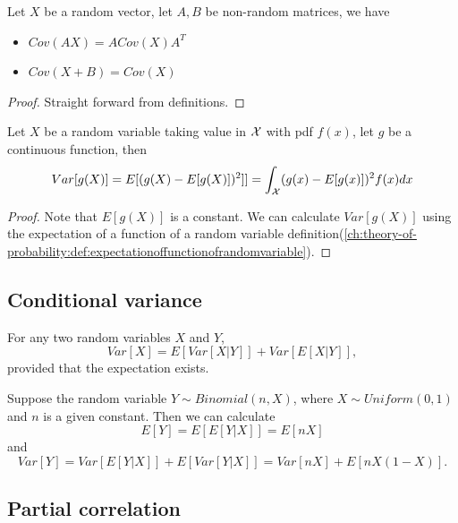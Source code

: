 \begin{refsection}
\begin{lemma}
	Let $X$ be a random vector, let $A,B$ be non-random matrices, we have
	\begin{itemize}
		\item $Cov(AX) = ACov(X)A^T$
		\item $Cov(X + B) = Cov(X)$
	\end{itemize}
\end{lemma}
\begin{proof}
	Straight forward from definitions.
\end{proof}

\begin{lemma}
	Let $X$ be a random variable taking value in $\mathcal{X}$ with pdf $f(x)$, let $g$ be a continuous function, then
	$$Var[g(X)] = E[(g(X) - E[g(X)])^2]] = \int_{\mathcal{X}} (g(x) - E[g(x)])^2f(x)dx$$
\end{lemma}
\begin{proof}
	Note that $E[g(X)]$ is a constant. We can calculate $Var[g(X)]$ using the expectation of a function of a random variable definition(\autoref{ch:theory-of-probability:def:expectationoffunctionofrandomvariable}).
\end{proof}

\subsection{Conditional variance}
\begin{theorem}\cite[193]{casella2002statistical}\label{ch:theory-of-probability:th:conditionalVarianceIdentity}
	For any two random variables $X$ and $Y$, 
	$$Var[X] = E[Var[X|Y]] + Var[E[X|Y]],$$
	provided that the expectation exists.
\end{theorem} 

\begin{example}
	Suppose the random variable $Y\sim Binomial(n,X)$, where $X\sim Uniform(0,1)$ and $n$ is a given constant. Then we can calculate
	$$E[Y] = E[E[Y|X]] = E[nX]$$
	and
	$$Var[Y] = Var[E[Y|X]] + E[Var[Y|X]] = Var[nX] + E[nX(1-X)].$$
\end{example}



\subsection{Partial correlation}


\end{refsection}
